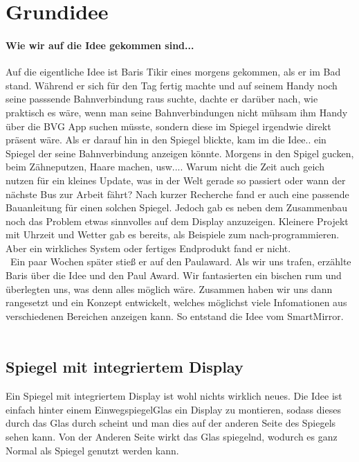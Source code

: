 \section{Grundidee}
\paragraph{Wie wir auf die Idee gekommen sind...}
Auf die eigentliche Idee ist Baris Tikir eines morgens gekommen, als er im Bad stand. Während er sich für den Tag fertig machte und auf seinem Handy noch seine passsende Bahnverbindung raus suchte, dachte er darüber nach, wie praktisch es wäre, wenn man seine Bahnverbindungen nicht mühsam ihm Handy über die BVG App suchen müsste, sondern diese im Spiegel irgendwie direkt präsent wäre. Als er darauf hin in den Spiegel blickte, kam im die Idee.. ein Spiegel  der seine Bahnverbindung anzeigen könnte. Morgens in den Spigel gucken, beim Zähneputzen, Haare machen, usw.... Warum nicht die Zeit auch geich nutzen für ein kleines Update, was in der Welt gerade so passiert oder wann der nächste Bus zur Arbeit fährt? Nach kurzer Recherche fand er auch eine passende Bauanleitung für einen solchen Spiegel. Jedoch gab es neben dem Zusammenbau noch das Problem etwas  sinnvolles auf dem Display anzuzeigen. Kleinere Projekt mit Uhrzeit und Wetter gab es bereits, als Beispiele zum nach-programmieren. Aber ein wirkliches System oder fertiges Endprodukt fand er nicht.
\\\
Ein paar Wochen später stieß er auf den Paulaward. Als wir uns trafen, erzählte Baris über die Idee und den Paul Award. Wir fantasierten ein bischen rum und überlegten uns, was denn alles möglich wäre. Zusammen haben wir uns dann rangesetzt und ein Konzept entwickelt, welches möglichst viele Infomationen aus verschiedenen Bereichen anzeigen kann. So entstand die Idee vom \dq SmartMirror\dq . \\\

\subsection{Spiegel mit integriertem Display}
Ein Spiegel mit integriertem Display ist wohl nichts wirklich neues. Die Idee ist einfach hinter einem EinwegspiegelGlas ein Display zu montieren, sodass dieses durch das Glas durch scheint und man dies auf der anderen Seite des Spiegels sehen kann. Von der Anderen Seite wirkt das Glas spiegelnd, wodurch es ganz Normal als Spiegel genutzt werden kann.
